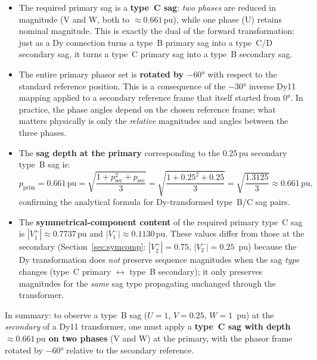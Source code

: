 \documentclass[a4paper,11pt]{article}
\begin{document}
\begin{itemize}
  \item The required primary sag is a \textbf{type~C sag}: \emph{two phases}
        are reduced in magnitude (V and W, both to $\approx 0.661\,\mathrm{pu}$),
        while one phase (U) retains nominal magnitude.  This is exactly the
        dual of the forward transformation: just as a Dy connection turns a
        type~B primary sag into a type~C/D secondary sag, it turns a
        type~C primary sag into a type~B secondary sag.

  \item The entire primary phasor set is \textbf{rotated by $-60°$} with
        respect to the standard reference position.  This is a consequence
        of the $-30°$ inverse Dy11 mapping applied to a secondary
        reference frame that itself started from $0°$.  In practice, the
        phase angles depend on the chosen reference frame; what matters
        physically is only the \emph{relative} magnitudes and angles
        between the three phases.

  \item The \textbf{sag depth at the primary} corresponding to the
        $0.25\,\mathrm{pu}$ secondary type~B sag is:
        \begin{equation}
          p_{\mathrm{prim}} = 0.661\,\mathrm{pu}
          = \sqrt{\frac{1+p_{\mathrm{sec}}^2 + p_{\mathrm{sec}}}{3}}
          = \sqrt{\frac{1+0.25^2+0.25}{3}} = \sqrt{\frac{1.3125}{3}}
          \approx 0.661\,\mathrm{pu},
        \end{equation}
        confirming the analytical formula for Dy-transformed type~B/C sag pairs.

  \item The \textbf{symmetrical-component content} of the required primary
        type~C sag is $|V^+_1|\approx0.7737\,\mathrm{pu}$ and
        $|V^-_1|\approx0.1130\,\mathrm{pu}$.  These values differ from
        those at the secondary (Section~\ref{sec:symcomp}: $|V^+_2|=0.75$,
        $|V^-_2|=0.25$~pu) because the Dy transformation does \emph{not}
        preserve sequence magnitudes when the sag \emph{type} changes
        (type~C primary $\leftrightarrow$ type~B secondary); it only
        preserves magnitudes for the \emph{same} sag type propagating
        unchanged through the transformer.
\end{itemize}

\noindent In summary: to observe a type~B sag ($U{=}1$, $V{=}0.25$,
$W{=}1$~pu) at the \emph{secondary} of a Dy11 transformer, one must apply
a \textbf{type~C sag with depth $\approx 0.661\,\mathrm{pu}$ on two phases}
(V and W) at the primary, with the phasor frame rotated by $-60°$ relative
to the secondary reference.
\end{document}
